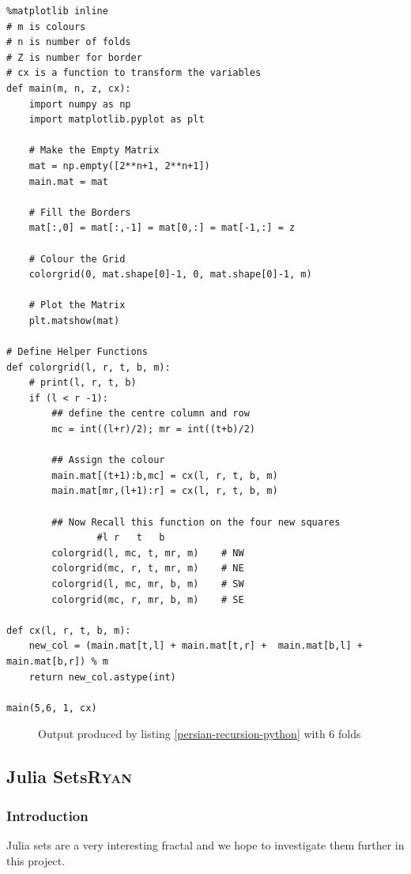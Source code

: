 \documentclass[11pt]{article}
\begin{document}
\begin{lstlisting}
%matplotlib inline
# m is colours
# n is number of folds
# Z is number for border
# cx is a function to transform the variables
def main(m, n, z, cx):
    import numpy as np
    import matplotlib.pyplot as plt

    # Make the Empty Matrix
    mat = np.empty([2**n+1, 2**n+1])
    main.mat = mat

    # Fill the Borders
    mat[:,0] = mat[:,-1] = mat[0,:] = mat[-1,:] = z

    # Colour the Grid
    colorgrid(0, mat.shape[0]-1, 0, mat.shape[0]-1, m)

    # Plot the Matrix
    plt.matshow(mat)

# Define Helper Functions
def colorgrid(l, r, t, b, m):
    # print(l, r, t, b)
    if (l < r -1):
        ## define the centre column and row
        mc = int((l+r)/2); mr = int((t+b)/2)

        ## Assign the colour
        main.mat[(t+1):b,mc] = cx(l, r, t, b, m)
        main.mat[mr,(l+1):r] = cx(l, r, t, b, m)

        ## Now Recall this function on the four new squares
                #l r   t   b
        colorgrid(l, mc, t, mr, m)    # NW
        colorgrid(mc, r, t, mr, m)    # NE
        colorgrid(l, mc, mr, b, m)    # SW
        colorgrid(mc, r, mr, b, m)    # SE

def cx(l, r, t, b, m):
    new_col = (main.mat[t,l] + main.mat[t,r] +  main.mat[b,l] + main.mat[b,r]) % m
    return new_col.astype(int)

main(5,6, 1, cx)
\end{lstlisting}



\begin{figure}[htbp]
\centering

\caption{\label{6-rug}Output produced by listing \ref{persian-recursion-python} with 6 folds}
\end{figure}

\subsection{Julia Sets\hfill{}\textsc{Ryan}}
\label{sec:org77c21c0}
\subsubsection{Introduction}
\label{sec:org5ae93ed}
Julia sets are a very interesting fractal and we hope to investigate them further in this project.
\end{document}
